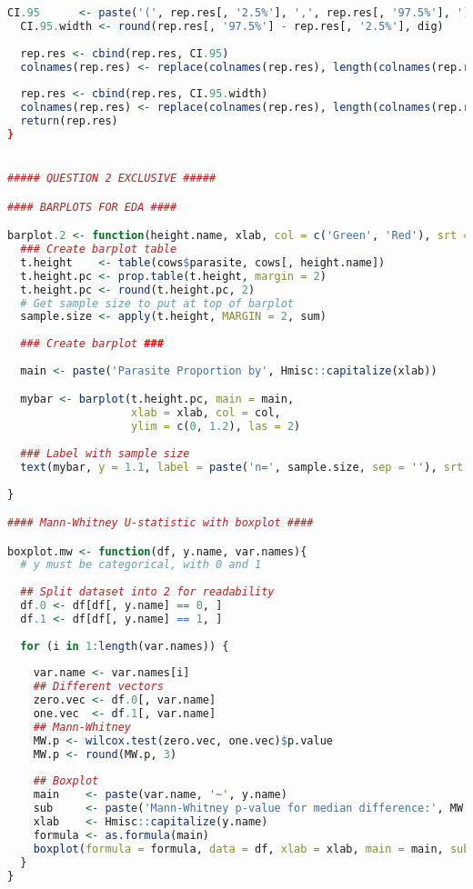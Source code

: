 \documentclass[11pt]{article}
\begin{document}
\begin{lstlisting}[language=R]
  CI.95      <- paste('(', rep.res[, '2.5%'], ',', rep.res[, '97.5%'], ')', sep='')
  CI.95.width <- round(rep.res[, '97.5%'] - rep.res[, '2.5%'], dig)
  
  rep.res <- cbind(rep.res, CI.95)
  colnames(rep.res) <- replace(colnames(rep.res), length(colnames(rep.res)), '95% CI')    
  
  rep.res <- cbind(rep.res, CI.95.width)
  colnames(rep.res) <- replace(colnames(rep.res), length(colnames(rep.res)), '95% CI Width')
  return(rep.res)
}


##### QUESTION 2 EXCLUSIVE #####

#### BARPLOTS FOR EDA ####

barplot.2 <- function(height.name, xlab, col = c('Green', 'Red'), srt = 90){
  ### Create barplot table
  t.height    <- table(cows$parasite, cows[, height.name])
  t.height.pc <- prop.table(t.height, margin = 2)
  t.height.pc <- round(t.height.pc, 2)
  # Get sample size to put at top of barplot
  sample.size <- apply(t.height, MARGIN = 2, sum)
  
  ### Create barplot ###
  
  main <- paste('Parasite Proportion by', Hmisc::capitalize(xlab))

  mybar <- barplot(t.height.pc, main = main, 
                   xlab = xlab, col = col, 
                   ylim = c(0, 1.2), las = 2)
  
  ### Label with sample size
  text(mybar, y = 1.1, label = paste('n=', sample.size, sep = ''), srt = srt)
  
}

#### Mann-Whitney U-statistic with boxplot ####

boxplot.mw <- function(df, y.name, var.names){
  # y must be categorical, with 0 and 1
  
  ## Split dataset into 2 for readability
  df.0 <- df[df[, y.name] == 0, ]
  df.1 <- df[df[, y.name] == 1, ]
  
  for (i in 1:length(var.names)) {
    
    var.name <- var.names[i]
    ## Different vectors
    zero.vec <- df.0[, var.name]
    one.vec  <- df.1[, var.name]
    ## Mann-Whitney
    MW.p <- wilcox.test(zero.vec, one.vec)$p.value
    MW.p <- round(MW.p, 3)
    
    ## Boxplot
    main    <- paste(var.name, '~', y.name)
    sub     <- paste('Mann-Whitney p-value for median difference:', MW.p)
    xlab    <- Hmisc::capitalize(y.name)
    formula <- as.formula(main)
    boxplot(formula = formula, data = df, xlab = xlab, main = main, sub = sub)
  }
}







\end{lstlisting}
\end{document}
